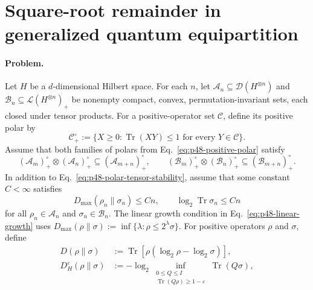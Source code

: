 \section{Square-root remainder in generalized quantum equipartition}
\label{sec:problem-48}

\paragraph{Problem.}
Let $H$ be a $d$-dimensional Hilbert space.  For each $n$, let
$\mathcal A_n\subseteq\mathcal D(H^{\otimes n})$ and
$\mathcal B_n\subseteq\mathcal L(H^{\otimes n})_+$ be nonempty compact,
convex, permutation-invariant sets, each closed under tensor products.  For a
positive-operator set $\mathcal C$, define its positive polar by
\begin{equation}
  \mathcal C_+^\circ
  :=\{X\geq0:\operatorname{Tr}(XY)\leq1
      \text{ for every }Y\in\mathcal C\}.
  \label{eq:p48-positive-polar}
\end{equation}
Assume that both families of polars from
Eq.~\eqref{eq:p48-positive-polar} satisfy
\begin{equation}
  (\mathcal A_m)_+^\circ\otimes(\mathcal A_n)_+^\circ
    \subseteq(\mathcal A_{m+n})_+^\circ,
  \qquad
  (\mathcal B_m)_+^\circ\otimes(\mathcal B_n)_+^\circ
    \subseteq(\mathcal B_{m+n})_+^\circ.
  \label{eq:p48-polar-tensor-stability}
\end{equation}
In addition to Eq.~\eqref{eq:p48-polar-tensor-stability}, assume that some
constant $C<\infty$ satisfies
\begin{equation}
  D_{\max}(\rho_n\|\sigma_n)\leq Cn,
  \qquad \log_2\operatorname{Tr}\sigma_n\leq Cn
  \label{eq:p48-linear-growth}
\end{equation}
for all $\rho_n\in\mathcal A_n$ and $\sigma_n\in\mathcal B_n$.  The linear
growth condition in Eq.~\eqref{eq:p48-linear-growth} uses
$D_{\max}(\rho\|\sigma):=\inf\{\lambda:\rho\leq2^\lambda\sigma\}$.
For positive operators $\rho$ and $\sigma$, define
\begin{equation}
  \begin{aligned}
  D(\rho\|\sigma)
    &:=\operatorname{Tr}[\rho(\log_2\rho-\log_2\sigma)],\\
  D_H^\varepsilon(\rho\|\sigma)
    &:=-\log_2\inf_{\substack{0\leq Q\leq I\\
                    \operatorname{Tr}(Q\rho)\geq1-\varepsilon}}
                    \operatorname{Tr}(Q\sigma),
  \end{aligned}
  \label{eq:p48-state-divergences}
\end{equation}
